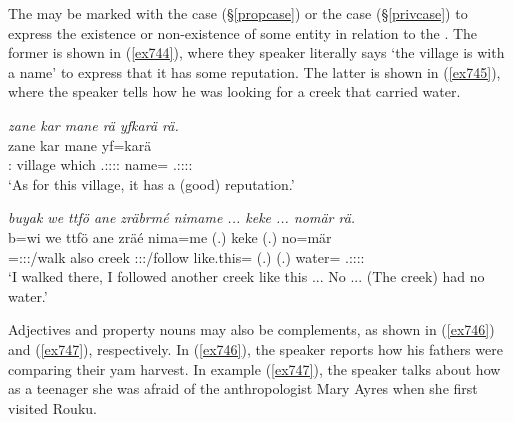 The  may be marked with the  case (\S\ref{propcase}) or the  case (\S\ref{privcase}) to express the existence or non-existence of some entity in relation to the  . The former is shown in (\ref{ex744}), where they speaker literally says `the village is with a name' to express that it has some reputation. The latter is shown in (\ref{ex745}), where the speaker tells how he was looking for a creek that carried water.

\begin{exe}
	\ex \emph{zane kar mane rä yfkarä rä.}\\
	\gll zane kar mane  yf=karä \\
	\Dem:{\Prox} village which \Tsg.\F:\Sbj:\Nonpast:\Ipfv:\Cop{} name={\Prop} \Tsg.\F:\Sbj:\Nonpast:\Ipfv:\Cop{}\\
	\trans `As for this village, it has a (good) reputation.'
	\label{ex744}
\end{exe}
\begin{exe}
	\ex \emph{buyak we ttfö ane zräbrmé nimame ... keke ... nomär rä.}\\
	\gll b=wi we ttfö ane zräé nima=me (.) keke (.) no=mär \\
	\Med=\Fsg:\Sbj:\Nonpast:\Ipfv/walk also creek {\Dem} \Fsg:\Sbj:\Irr:\Pfv/follow like.this={\Ins} (.) {\Neg} (.) water={\Priv} \Tsg.\F:\Sbj:\Nonpast:\Ipfv:\Cop\\
	\trans `I walked there, I followed another creek like this ... No ... (The creek) had no water.'
	\label{ex745}
\end{exe}

Adjectives and property nouns may also be  complements, as shown in (\ref{ex746}) and (\ref{ex747}), respectively. In (\ref{ex746}), the speaker reports how his fathers were comparing their yam harvest. In example (\ref{ex747}), the speaker talks about how as a teenager she was afraid of the anthropologist Mary Ayres when she first visited Rouku.

